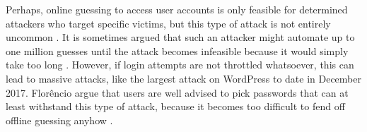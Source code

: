 Perhaps, online guessing to access user accounts is only feasible for determined attackers who target specific victims, but this type of attack is not entirely uncommon \cite{Florencio2013WhereDoAllTheAttacksGo, Florencio2014PasswordPortfoliosFiniteUser, Herley2015Counterfactuals, Wang2016TargetedGuessingUnderestimated}. It is sometimes argued that such an attacker might automate up to one million guesses until the attack becomes infeasible because it would simply take too long \cite{Bonneau2015ImperfectAuthentication, Florencio2014AdministratorsGuide}. However, if login attempts are not throttled whatsoever, this can lead to massive attacks, like the largest attack on WordPress to date in December 2017. 
Florêncio \etal argue that users are well advised to pick passwords that can at least withstand this type of attack, because it becomes too difficult to fend off offline guessing anyhow \cite{Florencio2014AdministratorsGuide, Florencio2014PasswordPortfoliosFiniteUser, Florencio2016CommACM}. 


